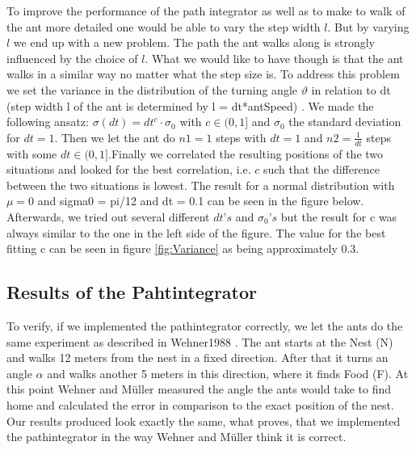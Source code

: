 \documentclass[11pt]{article}
\begin{document}
To improve the performance of the path integrator as well as to make to walk of the ant more detailed one would be able to vary the step width $l$. 
But by varying $l$ we end up with a new problem. The path the ant walks along is strongly influenced by the choice of $l$. What we would like to have though is that the ant walks in a similar way no matter what the step size is. 
To address this problem we set the variance in the distribution of the turning angle $\vartheta$ in relation to dt (step width l of the ant is determined by l = dt*antSpeed) . 
We made the following ansatz: $\sigma(dt) = dt^{c} \cdot \sigma_{0}$ with $c \in (0,1]$ and $\sigma_{0}$ the standard deviation for $dt = 1$.
Then we let the ant do $n1=1$ steps with $dt=1$ and $n2=\frac{1}{dt}$ steps with some $dt \in (0,1]$.Finally we correlated the resulting positions of the two situations and looked for the best correlation, i.e. $c$ such that the difference between the two situations is lowest. 
The result for a normal distribution with $\mu = 0$ and sigma0 = pi/12 and dt = 0.1 can be seen in the figure below.
Afterwards, we tried out several different $dt’s$ and $\sigma_{0}’s$ but the result for c was always similar to the one in the left side of the figure. The value for the best fitting c can be seen in figure \ref{fig:Variance} as being approximately 0.3.  




\subsection{Results of the Pahtintegrator}


To verify, if we implemented the pathintegrator correctly, we let the ants do the same experiment as described in Wehner1988 \cite{Wehner1988}.
The ant starts at the Nest (N) and walks 12 meters from the nest in a fixed direction. After that it turns an angle $\alpha$ and walks another 5 meters in this direction, where it finds Food (F). At this point Wehner and Müller measured the angle the ants would take to find home and calculated the error in comparison to the exact position of the nest.
Our results produced look exactly the same, what proves, that we implemented the pathintegrator in the way Wehner and Müller think it is correct.\\
\end{document}

